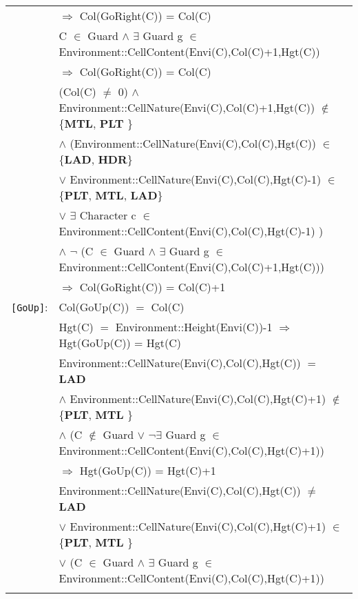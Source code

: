 \documentclass[8pt]{article}
\begin{document}
{\begin{longtable}{rl}
  & \quad\quad $\Rightarrow$ \textrm{Col(GoRight(C))} = \textrm{Col(C)} \\
  & \textrm{C} $\in$ \textrm{Guard} $\land$ $\exists$ \textrm{Guard} g $\in$ \textrm{Environment::CellContent(Envi(C),Col(C)+1,Hgt(C))} \\ & \quad\quad $\Rightarrow$ \textrm{Col(GoRight(C))} = \textrm{Col(C)} \\
  & (\textrm{Col(C)} $\neq$ 0) $\land$ \textrm{Environment::CellNature(Envi(C),Col(C)+1,Hgt(C))} $\notin$ \{\textbf{MTL}, \textbf{PLT} \} \\
  & \quad\quad $\land$ (\textrm{Environment::CellNature(Envi(C),Col(C),Hgt(C))} $\in$ \{\textbf{LAD}, \textbf{HDR}\} \\
  & \quad\quad\quad\quad $\lor$ \textrm{Environment::CellNature(Envi(C),Col(C),Hgt(C)-1)} $\in$ \{\textbf{PLT}, \textbf{MTL}, \textbf{LAD}\} \\
  & \quad\quad\quad\quad $\lor$ $\exists$ \textrm{Character} c $\in$ \textrm{Environment::CellContent(Envi(C),Col(C),Hgt(C)-1)} ) \\
  & \quad\quad $\land$ $\neg$ (\textrm{C} $\in$ \textrm{Guard} $\land$ $\exists$ \textrm{Guard} g $\in$ \textrm{Environment::CellContent(Envi(C),Col(C)+1,Hgt(C))}) \\
  & \quad\quad $\Rightarrow$ \textrm{Col(GoRight(C))} = \textrm{Col(C)}+1 \\
\texttt{[GoUp]}: & \textrm{Col(GoUp(C))} $=$ \textrm{Col(C)} \\
  & \textrm{Hgt(C)} $=$ \textrm{Environment::Height(Envi(C))-1} $\Rightarrow$ \textrm{Hgt(GoUp(C))} = \textrm{Hgt(C)} \\
  & \textrm{Environment::CellNature(Envi(C),Col(C),Hgt(C))} $=$ \textbf{LAD} \\
  & \quad\quad $\land$ \textrm{Environment::CellNature(Envi(C),Col(C),Hgt(C)+1)} $\notin$ \{\textbf{PLT}, \textbf{MTL} \} \\
  & \quad\quad $\land$ (\textrm{C} $\notin$ \textrm{Guard} $\lor$ $\neg$$\exists$ \textrm{Guard} g $\in$ \textrm{Environment::CellContent(Envi(C),Col(C),Hgt(C)+1)}) \\
  & \quad\quad $\Rightarrow$ \textrm{Hgt(GoUp(C))} = \textrm{Hgt(C)}+1 \\
  & \textrm{Environment::CellNature(Envi(C),Col(C),Hgt(C))} $\neq$ \textbf{LAD} \\
  & \quad\quad $\lor$ \textrm{Environment::CellNature(Envi(C),Col(C),Hgt(C)+1)} $\in$ \{\textbf{PLT}, \textbf{MTL} \} \\
  & \quad\quad $\lor$ (\textrm{C} $\in$ \textrm{Guard} $\land$ $\exists$ \textrm{Guard} g $\in$ \textrm{Environment::CellContent(Envi(C),Col(C),Hgt(C)+1)}) \\
$$
\end{longtable}}
\end{document}
